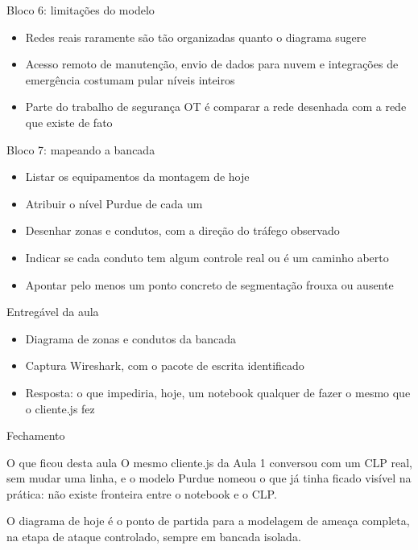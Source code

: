 \documentclass[12pt, aspectratio=169]{beamer}
\begin{document}
\begin{frame}{Bloco 6: limitações do modelo}
  \begin{itemize}
    \item Redes reais raramente são tão organizadas quanto o diagrama sugere
    \item Acesso remoto de manutenção, envio de dados para nuvem e integrações de emergência costumam pular níveis inteiros
    \item Parte do trabalho de segurança OT é comparar a rede desenhada com a rede que existe de fato
  \end{itemize}
\end{frame}

\begin{frame}{Bloco 7: mapeando a bancada}
  \vspace{0.35cm}
  \begin{itemize}
    \item Listar os equipamentos da montagem de hoje
    \item Atribuir o nível Purdue de cada um
    \item Desenhar zonas e condutos, com a direção do tráfego observado
    \item Indicar se cada conduto tem algum controle real ou é um caminho aberto
    \item Apontar pelo menos um ponto concreto de segmentação frouxa ou ausente
  \end{itemize}
\end{frame}

\begin{frame}{Entregável da aula}
  \vspace{0.4cm}
  \begin{itemize}
    \item Diagrama de zonas e condutos da bancada
    \item Captura Wireshark, com o pacote de escrita identificado
    \item Resposta: o que impediria, hoje, um notebook qualquer de fazer o mesmo que o cliente.js fez
  \end{itemize}
\end{frame}

\begin{frame}{Fechamento}
  \begin{block}{O que ficou desta aula}
    O mesmo cliente.js da Aula 1 conversou com um CLP real, sem
    mudar uma linha, e o modelo Purdue nomeou o que já tinha ficado
    visível na prática: não existe fronteira entre o notebook e o CLP.
  \end{block}

  \vspace{0.3cm}
  O diagrama de hoje é o ponto de partida para a modelagem de ameaça completa, na etapa de ataque controlado, sempre em bancada isolada.
\end{frame}
\end{document}
